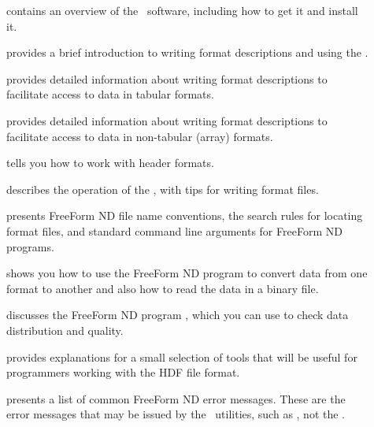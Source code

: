 \begin{description}

\item[] contains an overview of the \ffs\
  software, including how to get it and install it.

\item[] provides a brief introduction to writing
  format descriptions and using the \ffs .
  
\item[]provides detailed information about
  writing format descriptions to facilitate access to data in tabular
  formats.
  
\item[] provides detailed information about
  writing format descriptions to facilitate access to data in
  non-tabular (array) formats.
  
\item[] tells you how to work with header
  formats.

\item[] describes the operation of the \ffs ,
  with tips for writing format files.
  
\item[] presents FreeForm ND file name
  conventions, the search rules for locating format files, and
  standard command line arguments for FreeForm ND programs.
  
\item[] shows you how to use the FreeForm ND
  program \lit{newform} to convert data from one format to another and
  also how to read the data in a binary file.
 
\item[] discusses the FreeForm ND program
  \lit{checkvar}, which you can use to check data distribution and
  quality.

\item[] provides explanations for a small selection
  of tools that will be useful for programmers working with the HDF
  file format.
  
\item[] presents a list of common FreeForm ND error
  messages.  These are the error messages that may be issued by the
  \ffnd\ utilities, such as \lit{newform}, not the \ffs .

\end{description}

